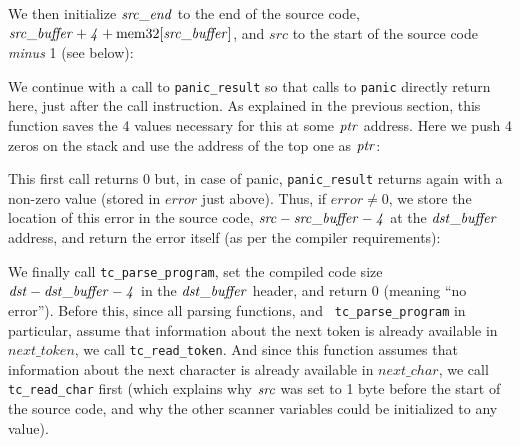 
We then initialize $\it{src\_end}$ to the end of the source code,
$\it{src\_buffer}+4+\mathrm{mem32}[\it{src\_buffer}]$, and $src$ to the start
of the source code {\em minus} 1 (see below):


We continue with a call to {\tt panic\_result} so that calls to {\tt panic}
directly return here, just after the call instruction. As explained in the
previous section, this function saves the 4 values necessary for this at some
$\it{ptr}$ address. Here we push 4 zeros on the stack and use the address of
the top one as $\it{ptr}$:


This first call returns 0 but, in case of panic, {\tt panic\_result} returns
again with a non-zero value (stored in $error$ just above). Thus, if $error \ne
0$, we store the location of this error in the source code,
$\it{src}-\it{src\_buffer}-4$ at the $\it{dst\_buffer}$ address, and return the
error itself (as per the compiler requirements):


We finally call {\tt tc\_parse\_program}, set the compiled code size
$\it{dst}-\it{dst\_buffer}-4$ in the $\it{dst\_buffer}$ header, and return 0
(meaning ``no error''). Before this, since all parsing functions, and {\tt
tc\_parse\_program} in particular, assume that information about the next token
is already available in $next\_token$, we call {\tt tc\_read\_token}. And since
this function assumes that information about the next character is already
available in $next\_char$, we call {\tt tc\_read\_char} first (which explains
why $\it{src}$ was set to 1 byte before the start of the source code, and why
the other scanner variables could be initialized to any value).

